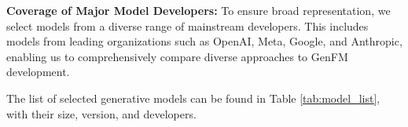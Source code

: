 \textbf{Coverage of Major Model Developers:} To ensure broad representation, we select models from a diverse range of mainstream developers. This includes models from leading organizations such as OpenAI, Meta, Google, and Anthropic, enabling us to comprehensively compare diverse approaches to GenFM development.


The list of selected generative models can be found in Table \ref{tab:model_list}, with their size, version, and developers.

\begin{table}[t]
\centering
\small
\caption{%
Implementation details of the three modules in TrustGen for evaluating each (sub) dimension of trustworthiness. For Metadata Curator, we apply three kinds of strategies: Web-Browsing Agent, Dataset Pool Maintainer, and Model Generation. For Test Case Builder, we apply the methods including Attribute-Guided Generation \cite{yu2024large}, Principle-Guided Generation \cite{gao2024best, constituationalAI} (\emph{i.e.}, AI constitution), Programmatic-Based Generation \cite{zhang2024task, huang2024position}, and LLM-Based Paraphrasing. The "Performance Overview" column visually represents the model scores for each (sub) dimension. The scores are normalized with higher values indicating better performance, and the models are arranged on x-axis in the same order as in \autoref{tab:model_list}.}
\renewcommand{\arraystretch}{1.2}


\end{table}

